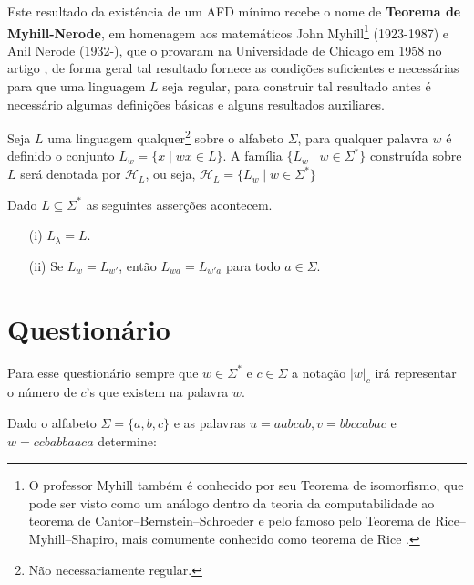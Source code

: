 Este resultado da existência de um AFD mínimo recebe o nome de \textbf{Teorema de Myhill-Nerode}, em homenagem aos matemáticos John Myhill\footnote{O professor Myhill também é conhecido por seu Teorema de isomorfismo\cite{myhill1957-isomorfismo}, que pode ser visto como um análogo dentro da teoria da computabilidade ao teorema de Cantor–Bernstein–Schroeder e pelo famoso pelo Teorema  de Rice–Myhill–Shapiro, mais comumente conhecido como teorema de Rice \cite{benjaLivro2010, rice1953-teorema-Rice}.} (1923-1987) e Anil Nerode (1932-), que o provaram na Universidade de Chicago em 1958 no artigo \cite{nerode1958}, de forma geral tal resultado fornece as condições suficientes e necessárias para que uma linguagem $L$ seja regular, para construir tal resultado antes é necessário algumas definições básicas e alguns resultados auxiliares.

\begin{definition}\label{def:FamiliaH-L}
	Seja $L$ uma linguagem qualquer\footnote{Não necessariamente regular.} sobre o alfabeto $\Sigma$, para qualquer palavra $w$ é definido o conjunto $L_w = \{x \mid wx \in L\}$. A família $\{L_w \mid w \in \Sigma^*\}$ construída sobre $L$ será denotada por $\mathcal{H}_L$, ou seja, $\mathcal{H}_L = \{L_w \mid w \in \Sigma^*\}$
\end{definition}


\begin{prop}
	Dado $L \subseteq \Sigma^*$ as seguintes asserções acontecem.
	\begin{itemize}
		\item[(i)] $L_\lambda = L$.
		\item[(ii)] Se $L_w = L_{w'}$, então $L_{wa} = L_{w'a}$ para todo $a \in \Sigma$.
	\end{itemize}
\end{prop}


\section{Questionário}

\begin{rema}
	Para esse questionário sempre que $w \in \Sigma^*$ e $c \in \Sigma$ a notação $|w|_c$ irá representar o número de $c$'s que existem na palavra $w$.
\end{rema}

\begin{exercise}\label{exerc:LR1}
	Dado o alfabeto $\Sigma = \{a, b, c\}$ e as palavras $u = aabcab, v = bbccabac$ e $w = ccbabbaaca$ determine:
\end{exercise}

